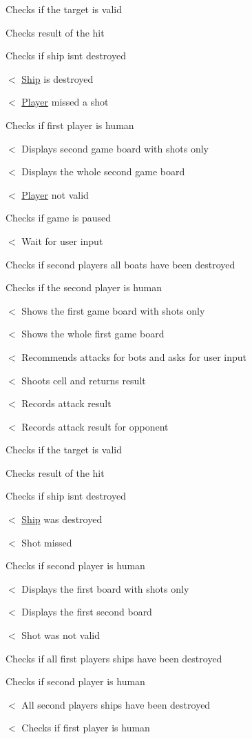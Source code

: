 Checks if the target is valid

Checks result of the hit

Checks if ship isn\textquotesingle{}t destroyed

$<$ \mbox{\hyperlink{class_ship}{Ship}} is destroyed

$<$ \mbox{\hyperlink{class_player}{Player}} missed a shot

Checks if first player is human

$<$ Displays second game board with shots only

$<$ Displays the whole second game board

$<$ \mbox{\hyperlink{class_player}{Player}} not valid

Checks if game is paused

$<$ Wait for user input

Checks if second player\textquotesingle{}s all boats have been destroyed

Checks if the second player is human

$<$ Shows the first game board with shots only

$<$ Shows the whole first game board

$<$ Recommends attacks for bots and asks for user input

$<$ Shoots cell and returns result

$<$ Records attack result

$<$ Records attack result for opponent

Checks if the target is valid

Checks result of the hit

Checks if ship isn\textquotesingle{}t destroyed

$<$ \mbox{\hyperlink{class_ship}{Ship}} was destroyed

$<$ Shot missed

Checks if second player is human

$<$ Displays the first board with shots only

$<$ Displays the first second board

$<$ Shot was not valid

Checks if all first player\textquotesingle{}s ships have been destroyed

Checks if second player is human

$<$ All second player\textquotesingle{}s ships have been destroyed

$<$ Checks if first player is human \mbox{\label{class_game_impl_a647d740893579abd77cc1d58ac600da7}} 
